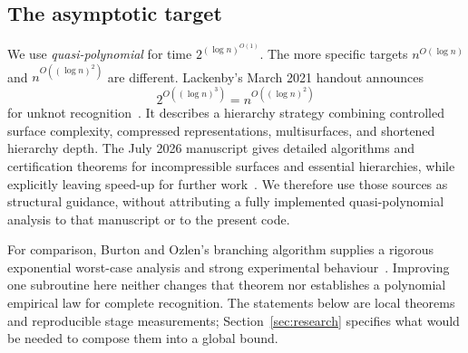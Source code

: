 \subsection{The asymptotic target}

We use \emph{quasi-polynomial} for time
\(2^{(\log n)^{O(1)}}\).  The more specific targets
\(n^{O(\log n)}\) and \(n^{O((\log n)^2)}\) are different.
Lackenby's March 2021 handout announces
\[
2^{O((\log n)^3)}=n^{O((\log n)^2)}
\]
for unknot recognition~\cite{Lackenby2021}.  It describes a hierarchy
strategy combining controlled surface complexity, compressed
representations, multisurfaces, and shortened hierarchy depth.
The July 2026 manuscript gives detailed algorithms and certification
theorems for incompressible surfaces and essential hierarchies, while
explicitly leaving speed-up for further work~\cite{Lackenby2026}.
We therefore use those sources as structural guidance, without
attributing a fully implemented quasi-polynomial analysis to that
manuscript or to the present code.

For comparison, Burton and Ozlen's branching algorithm supplies a
rigorous exponential worst-case analysis and strong experimental
behaviour~\cite{BurtonOzlen2012}.  Improving one subroutine here neither
changes that theorem nor establishes a polynomial empirical law for
complete recognition.  The statements below are local theorems and
reproducible stage measurements; Section~\ref{sec:research} specifies
what would be needed to compose them into a global bound.
